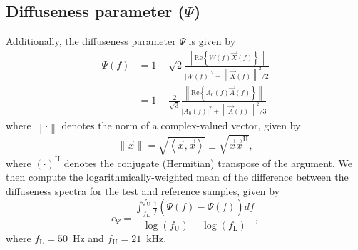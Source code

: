 \subsection{Diffuseness parameter (\texorpdfstring{$\Psi$}{Psi})}\label{sec:04_Auditory_Models:Diffuseness_Parameter}
Additionally, the diffuseness parameter $\Psi$ is given by \citep[Eq.~(12)]{MerimaaPulkki2005}
\begin{equation}\label{eq:04_Auditory_Models:Diffuseness}
\begin{split}
\Psi(f) &= 1 - \sqrt{2} \frac{ \left\| \text{Re} \left\{ \overline{W}(f) \vec{X}(f) \right\} \right\|}{\left| W(f) \right|^2 + \left\| \vec{X}(f) \right\|^2 / 2} \\
	&= 1 - \frac{2}{\sqrt{3}} \frac{ \left\| \text{Re} \left\{ \overline{A_0}(f) \vec{A}(f) \right\} \right\|}{\left| A_0(f) \right|^2 + \left\| \vec{A}(f) \right\|^2 / 3}
\end{split}
\end{equation}
where $\left\| \cdot \right\|$ denotes the norm of a complex-valued vector, given by
\begin{equation}
\| \vec{x} \| = \sqrt{\left\langle \vec{x}, \vec{x} \right\rangle} \equiv \sqrt{\vec{x} \vec{x}^\text{H}},
\end{equation}
where $(\cdot)^\text{H}$ denotes the conjugate (Hermitian) transpose of the argument.
We then compute the logarithmically-weighted mean of the difference between the diffuseness spectra for the test and reference samples, given by
\begin{equation}
e_\Psi = \frac{\displaystyle \int_{f_\text{L}}^{f_\text{U}} \frac{1}{f} \left( \tilde{\Psi}(f) - \Psi(f) \right) df}{\log(f_\text{U}) - \log(f_\text{L})},
\end{equation}
where $f_\text{L} = 50$~Hz and $f_\text{U} = 21$~kHz.